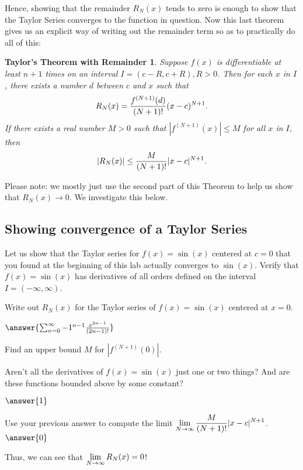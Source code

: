 \documentclass{ximera}
\newtheorem*{RemainderThm}{Taylor's Theorem with Remainder}
\begin{document}
Hence, showing that the remainder $R_N(x)$ tends to zero is enough to show that the Taylor Series converges to the function in question. Now this last theorem gives us an explicit way of writing out the remainder term so as to practically do all of this:

	\begin{RemainderThm}
		Suppose $f(x)$ is differentiable at least $n+1$ times on an interval $I=(c-R, c+R), R>0$. Then for each $x$ in $I$, there exists a number $d$ between $c$ and $x$ such that
		\[
			R_N(x) =  \displaystyle\frac{f^{(N+1)}(d)}{(N+1)!}(x-c)^{N+1}.
		\]
	If there exists a real number $M>0$ such that $|f^{(N+1)}(x)| \leq M$ for all $x$ in $I$, then
		\[
			|R_N(x)| \leq \displaystyle\frac{M}{(N+1)!}|x-c|^{N+1}.
		\]
	\end{RemainderThm}
Please note: we mostly just use the second part of this Theorem to help us show that $R_N(x) \to 0$. We investigate this below.	
	

\subsection*{Showing convergence of a Taylor Series}
Let us show that the Taylor series for $f(x) = \sin(x)$ centered at $c=0$ that you found at the beginning of this lab actually converges to $\sin(x)$.
Verify that $f(x) = \sin(x)$ has derivatives of all orders defined on the interval $I=(-\infty, \infty)$.

\begin{question}
Write out $R_N(x)$ for the Taylor series of $f(x) = \sin(x)$ centered at $x=0$.

$\answer{\sum_{n=0}^\infty -1^{n-1}\frac{x^{2n-1}}{(2n-1)!}}$

Find an upper bound $M$ for $|f^{(N+1)}(0)|$. \begin{hint} Aren't all the derivatives of $f(x) = \sin(x)$ just one or two things? And are these functions bounded above by some constant?\end{hint}

$\answer{1}$


Use your previous answer to compute the limit $\displaystyle \lim_{N \to \infty} \displaystyle\frac{M}{(N+1)!}|x-c|^{N+1}$.
$\answer{0}$
\end{question}
Thus, we can see that $\displaystyle \lim_{N \to \infty} R_N(x) = 0$!
\end{document}
